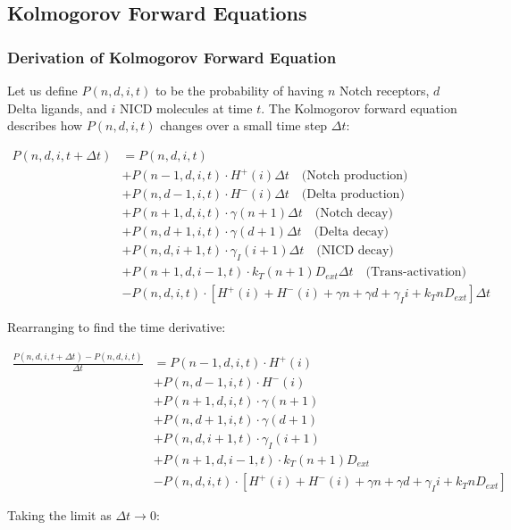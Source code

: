 \documentclass{article}
\begin{document}
\begin{flushleft}
\subsection{Kolmogorov Forward Equations}
\subsubsection{Derivation of Kolmogorov Forward Equation}

Let us define $P(n,d,i,t)$ to be the probability of having $n$ Notch receptors, $d$ Delta ligands, and $i$ NICD molecules at time $t$. The Kolmogorov forward equation describes how $P(n,d,i,t)$ changes over a small time step $\Delta t$:

\begin{align*}
P(n,d,i,t+\Delta t) &= P(n,d,i,t) \\
&+ P(n-1,d,i,t) \cdot H^+(i) \Delta t \quad \text{(Notch production)} \\
&+ P(n,d-1,i,t) \cdot H^-(i) \Delta t \quad \text{(Delta production)} \\
&+ P(n+1,d,i,t) \cdot \gamma(n+1)\Delta t \quad \text{(Notch decay)} \\
&+ P(n,d+1,i,t) \cdot \gamma(d+1)\Delta t \quad \text{(Delta decay)} \\
&+ P(n,d,i+1,t) \cdot \gamma_I(i+1)\Delta t \quad \text{(NICD decay)} \\
&+ P(n+1,d,i-1,t) \cdot k_T(n+1)D_{ext}\Delta t \quad \text{(Trans-activation)} \\
&- P(n,d,i,t) \cdot [H^+(i) + H^-(i) + \gamma n + \gamma d + \gamma_I i + k_T n D_{ext}]\Delta t
\end{align*}

Rearranging to find the time derivative:

\begin{align*}
\frac{P(n,d,i,t+\Delta t) - P(n,d,i,t)}{\Delta t} &= P(n-1,d,i,t) \cdot H^+(i) \\
&+ P(n,d-1,i,t) \cdot H^-(i) \\
&+ P(n+1,d,i,t) \cdot \gamma(n+1) \\
&+ P(n,d+1,i,t) \cdot \gamma(d+1) \\
&+ P(n,d,i+1,t) \cdot \gamma_I(i+1) \\
&+ P(n+1,d,i-1,t) \cdot k_T(n+1)D_{ext} \\
&- P(n,d,i,t) \cdot [H^+(i) + H^-(i) + \gamma n + \gamma d + \gamma_I i + k_T n D_{ext}]
\end{align*}

Taking the limit as $\Delta t \rightarrow 0$:


\end{flushleft}
\end{document}
